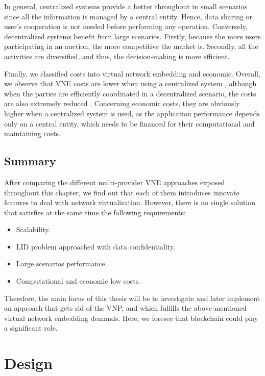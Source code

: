 In general, centralized systems provide a better throughout in small scenarios since all the information is managed by a central entity. Hence, data sharing or user's cooperation is not needed before performing any operation. Conversely, decentralized systems benefit from large scenarios. Firstly, because the more users participating in an auction, the more competitive the market is. Secondly, all the activities are diversified, and thus, the decision-making is more efficient. 

Finally, we classified costs into virtual network embedding and economic. Overall, we observe that VNE costs are lower when using a centralized system \citep{dietrich2015multi}, although when the parties are efficiently coordinated in a decentralized scenario, the costs are also extremely reduced \citep{chowdhury2010polyvine}. Concerning economic costs, they are obviously higher when a centralized system is used, as the application performance depends only on a central entity, which needs to be financed for their computational and maintaining costs.

\section{Summary}

After comparing the different multi-provider VNE approaches exposed throughout this chapter, we find out that each of them introduces innovate features to deal with network virtualization. However, there is no single solution that satisfies at the same time the following requirements:

\begin{itemize}
	\item Scalability.
	\item LID problem approached with data confidentiality.
	\item Large scenarios performance.
	\item Computational and economic low costs.
\end{itemize}

Therefore, the main focus of this thesis will be to investigate and later implement an approach that gets rid of the VNP, and which fulfills the above-mentioned virtual network embedding demands. Here, we foresee that blockchain could play a significant role.


\chapter{Design}
\label{ch:design}

